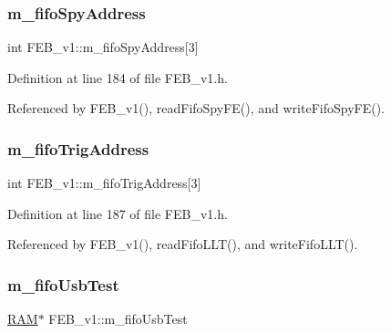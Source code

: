 \subsubsection{\texorpdfstring{m\+\_\+fifo\+Spy\+Address}{m\_fifoSpyAddress}}
{\footnotesize\ttfamily int F\+E\+B\+\_\+v1\+::m\+\_\+fifo\+Spy\+Address\mbox{[}3\mbox{]}\hspace{0.3cm}{\ttfamily [private]}}



Definition at line 184 of file F\+E\+B\+\_\+v1.\+h.



Referenced by F\+E\+B\+\_\+v1(), read\+Fifo\+Spy\+F\+E(), and write\+Fifo\+Spy\+F\+E().

\mbox{\label{classFEB__v1_ad41f8756c4e15815c6d5e35902cf2257}} 
\subsubsection{\texorpdfstring{m\+\_\+fifo\+Trig\+Address}{m\_fifoTrigAddress}}
{\footnotesize\ttfamily int F\+E\+B\+\_\+v1\+::m\+\_\+fifo\+Trig\+Address\mbox{[}3\mbox{]}\hspace{0.3cm}{\ttfamily [private]}}



Definition at line 187 of file F\+E\+B\+\_\+v1.\+h.



Referenced by F\+E\+B\+\_\+v1(), read\+Fifo\+L\+L\+T(), and write\+Fifo\+L\+L\+T().

\mbox{\label{classFEB__v1_a5850ce498462009212ad3f313fcf0bd6}} 
\subsubsection{\texorpdfstring{m\+\_\+fifo\+Usb\+Test}{m\_fifoUsbTest}}
{\footnotesize\ttfamily \hyperlink{classRAM}{R\+AM}$\ast$ F\+E\+B\+\_\+v1\+::m\+\_\+fifo\+Usb\+Test\hspace{0.3cm}{\ttfamily [private]}}




